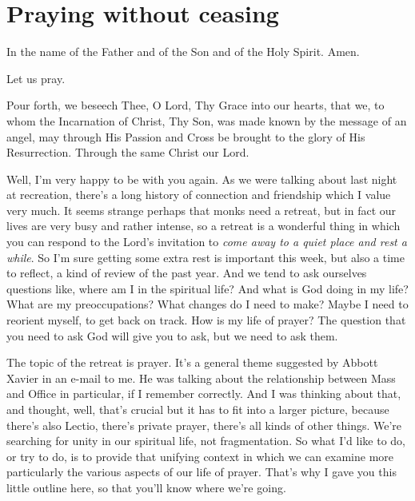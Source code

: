 \chapter{Praying without ceasing}



\begin{itshape}
In the name of the Father and of the Son and of the Holy Spirit. Amen.

\smallskip

\noindent Let us pray.

\smallskip

\noindent Pour forth, we beseech Thee, O Lord, Thy Grace into our hearts, that we, to whom the Incarnation of Christ, Thy Son, was made known by the message of an angel, may through His Passion and Cross be brought to the glory of His Resurrection. Through the same Christ our Lord.
\end{itshape}

\smallskip

Well, I'm very happy to be with you again. As we were talking about last night at recreation, there's a long history of connection and friendship which I value very much. It seems strange perhaps that monks need a retreat, but in fact our lives are very busy and rather intense, so a retreat is a wonderful thing in which you can respond to the Lord's invitation to \emph{come away to a quiet place and rest a while}. So I'm sure getting some extra rest is important this week, but also a time to reflect, a kind of review of the past year. And we tend to ask ourselves questions like, where am I in the spiritual life? And what is God doing in my life? What are my preoccupations? What changes do I need to make? Maybe I need to reorient myself, to get back on track. How is my life of prayer? The question that you need to ask God will give you to ask, but we need to ask them.

The topic of the retreat is prayer. It's a general theme suggested by Abbott Xavier in an e-mail to me. He was talking about the relationship between Mass and Office in particular, if I remember correctly. And I was thinking about that, and thought, well, that's crucial but it has to fit into a larger picture, because there's also Lectio, there's private prayer, there's all kinds of other things. We're searching for unity in our spiritual life, not fragmentation. So what I'd like to do, or try to do, is to provide that unifying context in which we can examine more particularly the various aspects of our life of prayer. That's why I gave you this little outline here, so that you'll know where we're going.

